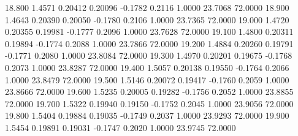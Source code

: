   18.800   1.4571   0.20412   0.20096  -0.1782   0.2116   1.0000  23.7068  72.0000
  18.900   1.4643   0.20390   0.20050  -0.1780   0.2106   1.0000  23.7365  72.0000
  19.000   1.4720   0.20355   0.19981  -0.1777   0.2096   1.0000  23.7628  72.0000
  19.100   1.4800   0.20311   0.19894  -0.1774   0.2088   1.0000  23.7866  72.0000
  19.200   1.4884   0.20260   0.19791  -0.1771   0.2080   1.0000  23.8084  72.0000
  19.300   1.4970   0.20201   0.19675  -0.1768   0.2073   1.0000  23.8287  72.0000
  19.400   1.5057   0.20138   0.19550  -0.1764   0.2066   1.0000  23.8479  72.0000
  19.500   1.5146   0.20072   0.19417  -0.1760   0.2059   1.0000  23.8666  72.0000
  19.600   1.5235   0.20005   0.19282  -0.1756   0.2052   1.0000  23.8855  72.0000
  19.700   1.5322   0.19940   0.19150  -0.1752   0.2045   1.0000  23.9056  72.0000
  19.800   1.5404   0.19884   0.19035  -0.1749   0.2037   1.0000  23.9293  72.0000
  19.900   1.5454   0.19891   0.19031  -0.1747   0.2020   1.0000  23.9745  72.0000

